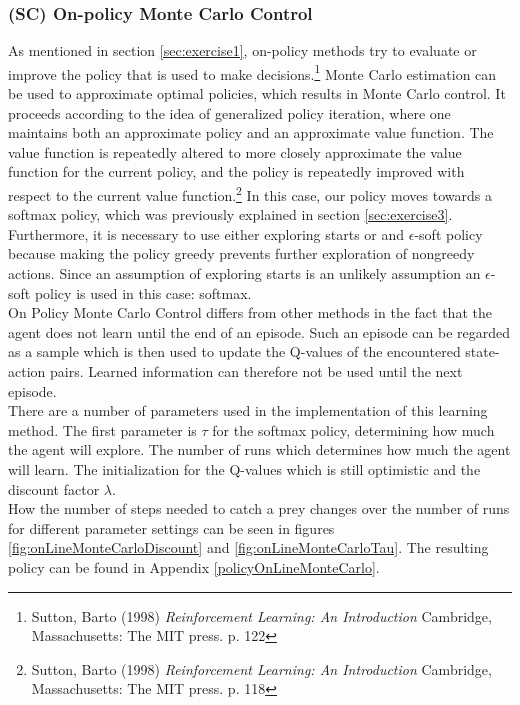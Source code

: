 \documentclass{article}
\begin{document}
\subsubsection{(SC) On-policy Monte Carlo Control}\label{sec:exercise4.1}
As mentioned in section \ref{sec:exercise1}, on-policy methods try to evaluate or improve the policy that is used to make decisions.\footnote{Sutton, Barto (1998) \textit{Reinforcement Learning: An Introduction} Cambridge, Massachusetts: The MIT press. p. 122} Monte Carlo estimation can be used to approximate optimal policies, which results in Monte Carlo control. It proceeds according to the idea of generalized policy iteration, where one maintains both an approximate policy and an approximate value function. The value function is repeatedly altered to more closely approximate the value function for the current policy, and the policy is repeatedly improved with respect to the current value function.\footnote{Sutton, Barto (1998) \textit{Reinforcement Learning: An Introduction} Cambridge, Massachusetts: The MIT press. p. 118} In this case, our policy moves towards a softmax policy, which was previously explained in section \ref{sec:exercise3}. Furthermore, it is necessary to use either exploring starts or and $\epsilon$-soft policy because making the policy greedy prevents further exploration of nongreedy actions. Since an assumption of exploring starts is an unlikely assumption an $\epsilon$-soft policy is used in this case: softmax.\\ 

On Policy Monte Carlo Control differs from other methods in the fact that the agent does not learn until the end of an episode. Such an episode can be regarded as a sample which is then used to update the Q-values of the encountered state-action pairs. Learned information can therefore not be used until the next episode.\\ 

There are a number of parameters used in the implementation of this learning method. The first parameter is $\tau$ for the softmax policy, determining how much the agent will explore. The number of runs which determines how much the agent will learn. The initialization for the Q-values which is still optimistic and the discount factor $\lambda$.\\  

How the number of steps needed to catch a prey changes over the number of runs for different parameter settings can be seen in figures \ref{fig:onLineMonteCarloDiscount} and \ref{fig:onLineMonteCarloTau}. The resulting policy can be found in Appendix \ref{policyOnLineMonteCarlo}.
\end{document}
